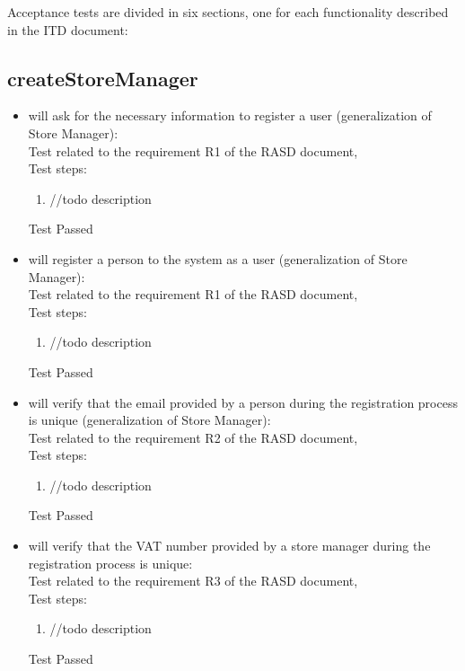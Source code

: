 Acceptance tests are divided in six sections, one for each functionality described in the ITD document:

\subsection{createStoreManager}

\begin{itemize}
    \item will ask for the necessary information to register a user (generalization of Store Manager): \\
    Test related to the requirement R1 of the RASD document, \\
    Test steps:
    \begin{enumerate}
        \item //todo description
    \end{enumerate}
    Test Passed \\

    \item will register a person to the system as a user (generalization of Store Manager): \\
    Test related to the requirement R1 of the RASD document, \\
    Test steps:
    \begin{enumerate}
        \item //todo description
    \end{enumerate}
    Test Passed\\

    \item will verify that the email provided by a person during the registration process is unique (generalization of Store Manager): \\
    Test related to the requirement R2 of the RASD document, \\
    Test steps:
    \begin{enumerate}
        \item //todo description
    \end{enumerate}
    Test Passed \\

    \item will verify that the VAT number provided by a store manager during the registration process is unique: \\
    Test related to the requirement R3 of the RASD document, \\
    Test steps:
    \begin{enumerate}
        \item //todo description
    \end{enumerate}
    Test Passed \\


\end{itemize}
